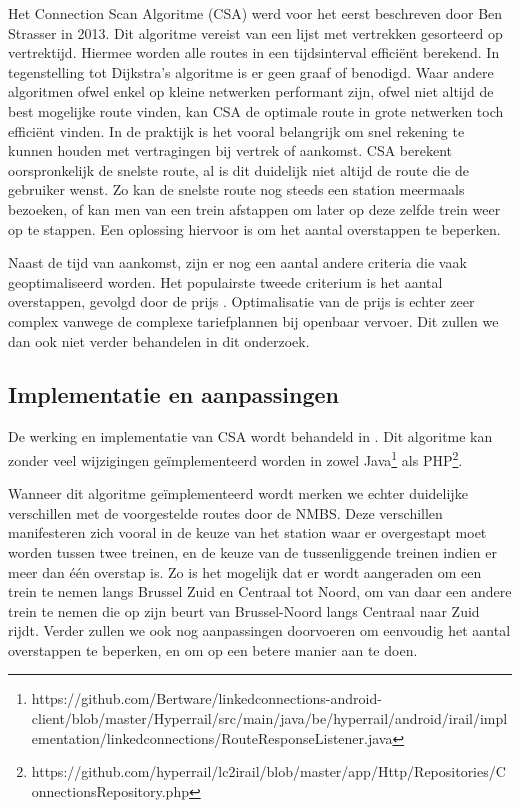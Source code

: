 Het Connection Scan Algoritme (CSA) werd voor het eerst beschreven door Ben Strasser in 2013\citep{strasser13}. Dit algoritme vereist van een lijst met vertrekken gesorteerd op vertrektijd. Hiermee worden alle routes in een tijdsinterval efficiënt berekend\citep{strasser14,strasser17}. In tegenstelling tot Dijkstra's algoritme is er geen graaf of  benodigd. Waar andere algoritmen ofwel enkel op kleine netwerken performant zijn, ofwel niet altijd de  best mogelijke route vinden, kan CSA de optimale route in grote netwerken toch efficiënt vinden\citep{strasser14}. In de praktijk is het vooral belangrijk om snel rekening te kunnen houden met vertragingen bij vertrek of aankomst\citep{strasser14,strasser17}. CSA berekent oorspronkelijk de snelste route, al is dit duidelijk niet altijd de route die de gebruiker wenst. Zo kan de snelste route nog steeds een station meermaals bezoeken, of kan men van een trein afstappen om later op deze zelfde trein weer op te stappen. Een oplossing hiervoor is om het aantal overstappen te beperken\citep{strasser14}.

Naast de tijd van aankomst, zijn er nog een aantal andere criteria die vaak geoptimaliseerd worden. Het populairste tweede criterium is het aantal overstappen, gevolgd door de prijs \citep{strasser17}. Optimalisatie van de prijs is echter zeer complex vanwege de complexe tariefplannen bij openbaar vervoer\citep{muller06}. Dit zullen we dan ook niet verder behandelen in dit onderzoek. 

\subsection{Implementatie en aanpassingen}
De werking en implementatie van CSA wordt behandeld in \citep{strasser17}. Dit algoritme kan zonder veel wijzigingen geïmplementeerd worden in zowel Java\footnote{https://github.com/Bertware/linkedconnections-android-client/blob/master/Hyperrail/src/main/java/be/hyperrail/android/irail/implementation/linkedconnections/RouteResponseListener.java} als PHP\footnote{https://github.com/hyperrail/lc2irail/blob/master/app/Http/Repositories/ConnectionsRepository.php}.

Wanneer dit algoritme geïmplementeerd wordt merken we echter duidelijke verschillen met de voorgestelde routes door de NMBS. Deze verschillen manifesteren zich vooral in de keuze van het station waar er overgestapt moet worden tussen twee treinen, en de keuze van de tussenliggende treinen indien er meer dan één overstap is. Zo is het mogelijk dat er wordt aangeraden om een trein te nemen langs Brussel Zuid en Centraal tot Noord, om van daar een andere trein te nemen die op zijn beurt van Brussel-Noord langs Centraal naar Zuid rijdt.
Verder zullen we ook nog aanpassingen doorvoeren om eenvoudig het aantal overstappen te beperken, en om op een betere manier aan  te doen.


